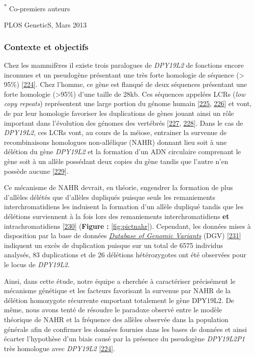 \documentclass[12pt,a4paper,twoside]{ugathesis}
\theoremstyle{definition}
\theoremstyle{definition}
\theoremstyle{definition}
\theoremstyle{remark}
\begin{document}
\textsuperscript{*} Co-premiers auteurs

PLOS GeneticS, Mars 2013

\newpage

\subsubsection{Contexte et objectifs}\label{contexte-et-objectifs-5}

Chez les mammifères il existe trois paralogues de \emph{DPY19L2} de
fonctions encore inconnues et un pseudogène présentant une très forte
homologie de séquence (\textgreater{} 95\%)
{[}\protect\hyperlink{ref-Carson2006}{224}{]}. Chez l'homme, ce gène est
flanqué de deux séquences présentant une forte homologie
(\textgreater{}95\%) d'une taille de 28kb. Ces séquences appelées LCRs
(\emph{low copy repeats}) représentent une large portion du génome
humain {[}\protect\hyperlink{ref-Cheung2003}{225},
\protect\hyperlink{ref-Bailey2002}{226}{]} et vont, de par leur
homologie favoriser les duplications de gènes jouant ainsi un rôle
important dans l'évolution des génomes des vertébrés
{[}\protect\hyperlink{ref-Walsh2003}{227},
\protect\hyperlink{ref-Ohno1970}{228}{]}. Dans le cas de \emph{DPY19L2},
ces LCRs vont, au cours de la méiose, entrainer la survenue de
recombinaisons homologues non-allélique (NAHR) donnant lieu soit à une
délétion du gène \emph{DPY19L2} et la formation d'un ADN circulaire
comprenant le gène soit à un allèle possédant deux copies du gène tandis
que l'autre n'en possède aucune
{[}\protect\hyperlink{ref-Harbuz2011a}{229}{]}.

Ce mécanisme de NAHR devrait, en théorie, engendrer la formation de plus
d'allèles délétés que d'allèles dupliqués puisque seuls les remaniements
interchromatidiens les induisent la formation d'un allèle dupliqué
tandis que les délétions surviennent à la fois lors des remaniements
interchromatidiens \textbf{et} intrachromatidiens
{[}\protect\hyperlink{ref-Liu2012}{230}{]} (\textbf{Figure :
}\ref{fig:pictnahr}). Cependant, les données mises à disposition par la
base de données \href{http://dgv.tcag.ca/dgv/app/home}{\emph{Database of
Genomic Variants}} (DGV)
{[}\protect\hyperlink{ref-MacDonald2014}{231}{]} indiquent un excès de
duplication puisque sur un total de 6575 individus analysés, 83
duplications et de 26 délétions hétérozygotes ont été observées pour le
locus de \emph{DPY19L2}.

Ainsi, dans cette étude, notre équipe a cherchée à caractériser
précisément le mécanisme génétique et les facteurs favorisant la
survenue par NAHR de la délétion homozygote récurrente emportant
totalement le gène DPY19L2. De même, nous avons tenté de résoudre le
paradoxe observé entre le modèle théorique de NAHR et la fréquence des
allèles observée dans la population générale afin de confirmer les
données fournies dans les bases de données et ainsi écarter l'hypothèse
d'un biais causé par la présence du pseudogène \emph{DPY19L2P1} très
homologue avec \emph{DPY19L2}
{[}\protect\hyperlink{ref-Carson2006}{224}{]}.
\end{document}
